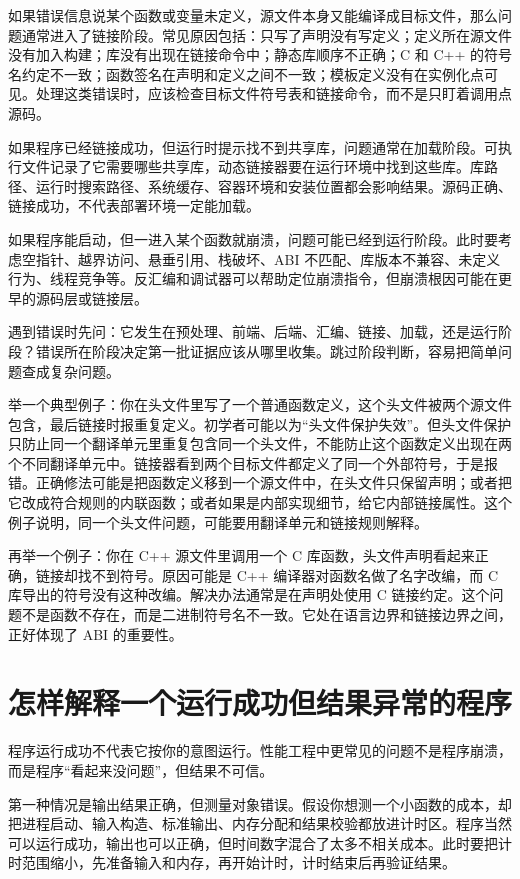 如果错误信息说某个函数或变量未定义，源文件本身又能编译成目标文件，那么问题通常进入了链接阶段。常见原因包括：只写了声明没有写定义；定义所在源文件没有加入构建；库没有出现在链接命令中；静态库顺序不正确；C 和 C++ 的符号名约定不一致；函数签名在声明和定义之间不一致；模板定义没有在实例化点可见。处理这类错误时，应该检查目标文件符号表和链接命令，而不是只盯着调用点源码。

如果程序已经链接成功，但运行时提示找不到共享库，问题通常在加载阶段。可执行文件记录了它需要哪些共享库，动态链接器要在运行环境中找到这些库。库路径、运行时搜索路径、系统缓存、容器环境和安装位置都会影响结果。源码正确、链接成功，不代表部署环境一定能加载。

如果程序能启动，但一进入某个函数就崩溃，问题可能已经到运行阶段。此时要考虑空指针、越界访问、悬垂引用、栈破坏、ABI 不匹配、库版本不兼容、未定义行为、线程竞争等。反汇编和调试器可以帮助定位崩溃指令，但崩溃根因可能在更早的源码层或链接层。

\begin{mentalmodel}
遇到错误时先问：它发生在预处理、前端、后端、汇编、链接、加载，还是运行阶段？错误所在阶段决定第一批证据应该从哪里收集。跳过阶段判断，容易把简单问题查成复杂问题。
\end{mentalmodel}

举一个典型例子：你在头文件里写了一个普通函数定义，这个头文件被两个源文件包含，最后链接时报重复定义。初学者可能以为“头文件保护失效”。但头文件保护只防止同一个翻译单元里重复包含同一个头文件，不能防止这个函数定义出现在两个不同翻译单元中。链接器看到两个目标文件都定义了同一个外部符号，于是报错。正确修法可能是把函数定义移到一个源文件中，在头文件只保留声明；或者把它改成符合规则的内联函数；或者如果是内部实现细节，给它内部链接属性。这个例子说明，同一个头文件问题，可能要用翻译单元和链接规则解释。

再举一个例子：你在 C++ 源文件里调用一个 C 库函数，头文件声明看起来正确，链接却找不到符号。原因可能是 C++ 编译器对函数名做了名字改编，而 C 库导出的符号没有这种改编。解决办法通常是在声明处使用 C 链接约定。这个问题不是函数不存在，而是二进制符号名不一致。它处在语言边界和链接边界之间，正好体现了 ABI 的重要性。

\section{怎样解释一个运行成功但结果异常的程序}

程序运行成功不代表它按你的意图运行。性能工程中更常见的问题不是程序崩溃，而是程序“看起来没问题”，但结果不可信。

第一种情况是输出结果正确，但测量对象错误。假设你想测一个小函数的成本，却把进程启动、输入构造、标准输出、内存分配和结果校验都放进计时区。程序当然可以运行成功，输出也可以正确，但时间数字混合了太多不相关成本。此时要把计时范围缩小，先准备输入和内存，再开始计时，计时结束后再验证结果。

